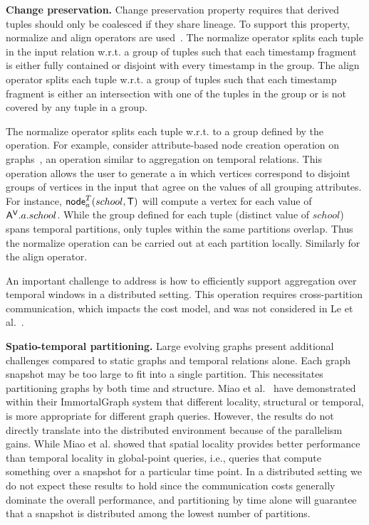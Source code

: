 {\bf Change preservation.}  Change preservation property requires that
derived tuples should only be coalesced if they share lineage.  To
support this property, normalize and align operators are
used~\cite{Dignos2012}.  The normalize operator splits each tuple in
the input relation w.r.t. a group of tuples such that each timestamp
fragment is either fully contained or disjoint with every timestamp in
the group.  The align operator splits each tuple w.r.t. a group of
tuples such that each timestamp fragment is either an intersection
with one of the tuples in the group or is not covered by any tuple in
a group.

The normalize operator splits each tuple w.r.t. to a group defined by
the operation.  For example, consider attribute-based node creation
operation on graphs~\cite{PortalarXiv2016}, an operation similar to
aggregation on temporal relations.  This operation allows the user to
generate a \tg in which vertices correspond to disjoint groups of
vertices in the input that agree on the values of all grouping
attributes.  For instance, $\textsf{node}^T_a(school,\mathsf{T})$ will
compute a vertex for each value of $\mathsf{A^{V}}.a.school$.  While the group
defined for each tuple (distinct value of $school$) spans temporal
partitions, only tuples within the same partitions overlap.  Thus the
normalize operation can be carried out at each partition locally.
Similarly for the align operator.

An important challenge to address is how to efficiently support
aggregation over temporal windows in a distributed setting.  This
operation requires cross-partition communication, which impacts the
cost model, and was not considered in Le et al.~\cite{Le2013}.

{\bf Spatio-temporal partitioning.}  Large evolving graphs present
additional challenges compared to static graphs and temporal relations
alone.  Each graph snapshot may be too large to fit into a single
partition.  This necessitates partitioning graphs by both time and
structure.  Miao et al.~\cite{Miao2015} have demonstrated within their
ImmortalGraph system that different locality, structural or temporal,
is more appropriate for different graph queries.  However, the results
do not directly translate into the distributed environment because of
the parallelism gains.  While Miao et al. showed that spatial locality
provides better performance than temporal locality in global-point
queries, i.e., queries that compute something over a snapshot for a
particular time point.  In a distributed setting we do not expect
these results to hold since the communication costs generally dominate
the overall performance, and partitioning by time alone will guarantee
that a snapshot is distributed among the lowest number of partitions.

